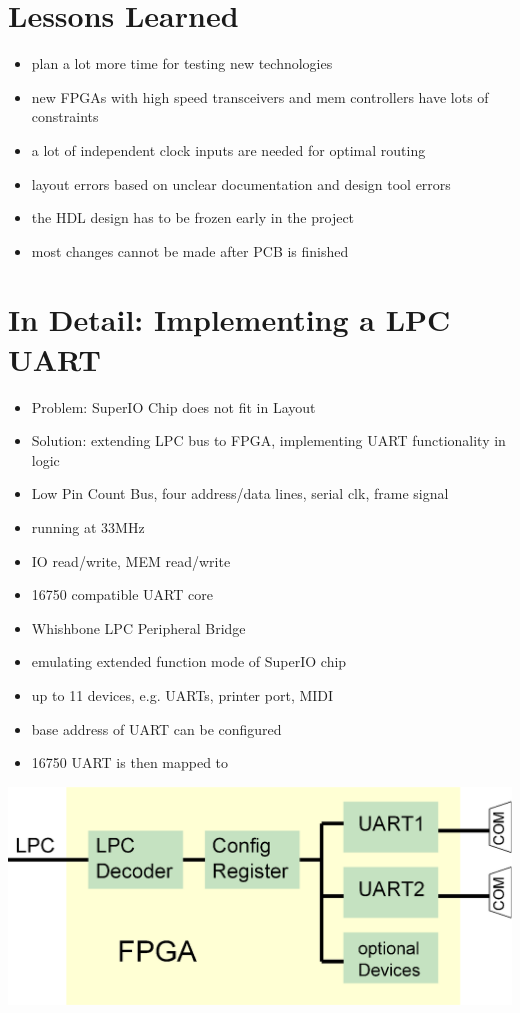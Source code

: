 \documentclass[25pt,halfparskip-,pagesize]{scrartcl}
\begin{document}
\begin{multicols*}{3}
\section{Lessons Learned}
\begin{itemize}
	\item plan a lot more time for testing new technologies
	\item new FPGAs with high speed transceivers and mem controllers have lots of constraints
	\item a lot of independent clock inputs are needed for optimal routing
	\item layout errors based on unclear documentation and design tool errors
	\item the HDL design has to be frozen early in the project
	\item most changes cannot be made after PCB is finished
\end{itemize}


\section{In Detail: Implementing a LPC UART}
\begin{itemize}
	\item Problem: SuperIO Chip does not fit in Layout
	\item Solution: extending LPC bus to FPGA, implementing UART functionality in logic
	\item Low Pin Count Bus, four address/data lines, serial clk, frame signal
	\item running at 33MHz
	\item IO read/write, MEM read/write
	\item 16750 compatible UART core
	\item Whishbone LPC Peripheral Bridge
	\item emulating extended function mode of SuperIO chip
	\item up to 11 devices, e.g. UARTs, printer port, MIDI
	\item base address of UART can be configured
	\item 16750 UART is then mapped to 
\end{itemize}

\includegraphics[width=\columnwidth]{../images/lpc_schema.eps}


\end{multicols*}
\end{document}
